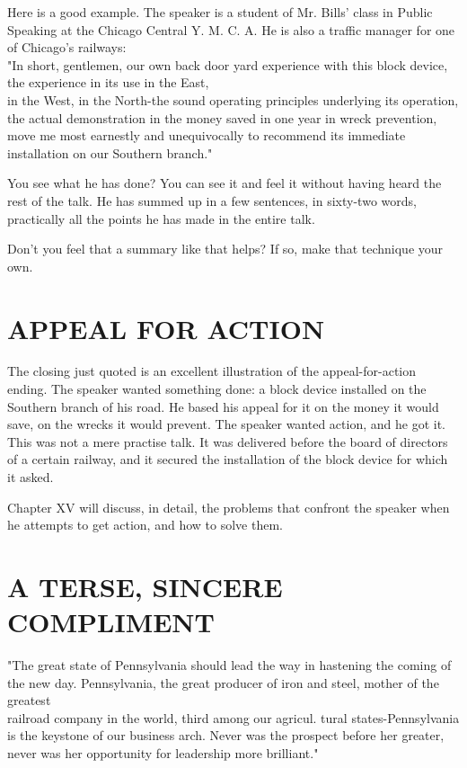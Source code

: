 \documentclass[10pt]{article}
\begin{document}
Here is a good example. The speaker is a student of Mr. Bills' class in Public Speaking at the Chicago Central Y. M. C. A. He is also a traffic manager for one of Chicago's railways:\\
"In short, gentlemen, our own back door yard experience with this block device, the experience in its use in the East,\\
in the West, in the North-the sound operating principles underlying its operation, the actual demonstration in the money saved in one year in wreck prevention, move me most earnestly and unequivocally to recommend its immediate installation on our Southern branch."

You see what he has done? You can see it and feel it without having heard the rest of the talk. He has summed up in a few sentences, in sixty-two words, practically all the points he has made in the entire talk.

Don't you feel that a summary like that helps? If so, make that technique your own.

\section*{APPEAL FOR ACTION}
The closing just quoted is an excellent illustration of the appeal-for-action ending. The speaker wanted something done: a block device installed on the Southern branch of his road. He based his appeal for it on the money it would save, on the wrecks it would prevent. The speaker wanted action, and he got it. This was not a mere practise talk. It was delivered before the board of directors of a certain railway, and it secured the installation of the block device for which it asked.

Chapter XV will discuss, in detail, the problems that confront the speaker when he attempts to get action, and how to solve them.

\section*{A TERSE, SINCERE COMPLIMENT}
"The great state of Pennsylvania should lead the way in hastening the coming of the new day. Pennsylvania, the great producer of iron and steel, mother of the greatest\\
railroad company in the world, third among our agricul. tural states-Pennsylvania is the keystone of our business arch. Never was the prospect before her greater, never was her opportunity for leadership more brilliant."
\end{document}
